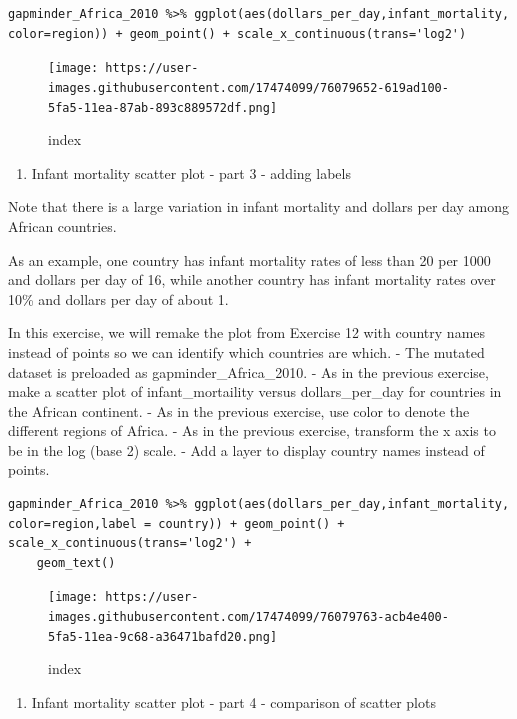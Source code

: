 \documentclass[
]{article}
\providecommand{\tightlist}{%
  \setlength{\itemsep}{0pt}\setlength{\parskip}{0pt}}
\begin{document}
\begin{verbatim}
gapminder_Africa_2010 %>% ggplot(aes(dollars_per_day,infant_mortality, color=region)) + geom_point() + scale_x_continuous(trans='log2')
\end{verbatim}

\begin{figure}
\centering
\texttt{[image: https://user-images.githubusercontent.com/17474099/76079652-619ad100-5fa5-11ea-87ab-893c889572df.png]}
\caption{index}
\end{figure}

\begin{enumerate}
\def\labelenumi{\arabic{enumi}.}
\setcounter{enumi}{12}
\tightlist
\item
  Infant mortality scatter plot - part 3 - adding labels
\end{enumerate}

Note that there is a large variation in infant mortality and dollars per
day among African countries.

As an example, one country has infant mortality rates of less than 20
per 1000 and dollars per day of 16, while another country has infant
mortality rates over 10\% and dollars per day of about 1.

In this exercise, we will remake the plot from Exercise 12 with country
names instead of points so we can identify which countries are which. -
The mutated dataset is preloaded as gapminder\_Africa\_2010. - As in the
previous exercise, make a scatter plot of infant\_mortaility versus
dollars\_per\_day for countries in the African continent. - As in the
previous exercise, use color to denote the different regions of Africa.
- As in the previous exercise, transform the x axis to be in the log
(base 2) scale. - Add a layer to display country names instead of
points.

\begin{verbatim}
gapminder_Africa_2010 %>% ggplot(aes(dollars_per_day,infant_mortality, color=region,label = country)) + geom_point() + scale_x_continuous(trans='log2') +
    geom_text()
\end{verbatim}

\begin{figure}
\centering
\texttt{[image: https://user-images.githubusercontent.com/17474099/76079763-acb4e400-5fa5-11ea-9c68-a36471bafd20.png]}
\caption{index}
\end{figure}

\begin{enumerate}
\def\labelenumi{\arabic{enumi}.}
\setcounter{enumi}{13}
\tightlist
\item
  Infant mortality scatter plot - part 4 - comparison of scatter plots
\end{enumerate}
\end{document}
